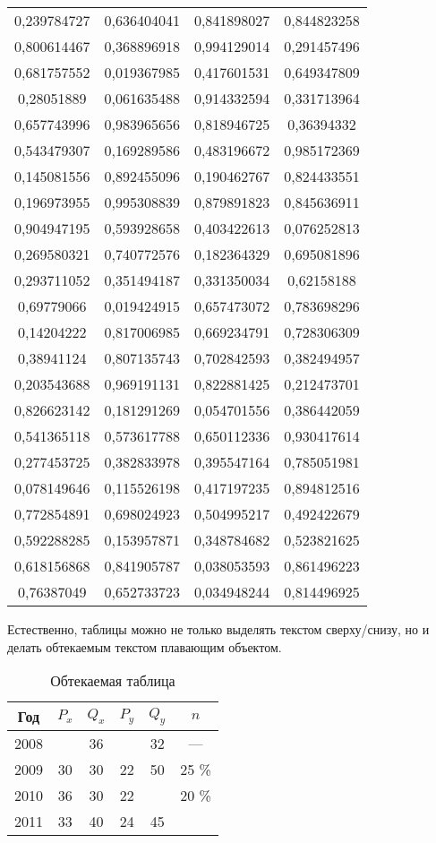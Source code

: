 \documentclass[a4paper,12pt]{article} %
\begin{document}
\begin{longtable}{|c|c|c|c|}
	0,239784727 & 0,636404041 & 0,841898027 & 0,844823258 \\
	0,800614467 & 0,368896918 & 0,994129014 & 0,291457496 \\
	0,681757552 & 0,019367985 & 0,417601531 & 0,649347809 \\
	0,28051889 & 0,061635488 & 0,914332594 & 0,331713964 \\
	0,657743996 & 0,983965656 & 0,818946725 & 0,36394332 \\
	0,543479307 & 0,169289586 & 0,483196672 & 0,985172369 \\
	0,145081556 & 0,892455096 & 0,190462767 & 0,824433551 \\
	0,196973955 & 0,995308839 & 0,879891823 & 0,845636911 \\
	0,904947195 & 0,593928658 & 0,403422613 & 0,076252813 \\
	0,269580321 & 0,740772576 & 0,182364329 & 0,695081896 \\
	0,293711052 & 0,351494187 & 0,331350034 & 0,62158188 \\
	0,69779066 & 0,019424915 & 0,657473072 & 0,783698296 \\
	0,14204222 & 0,817006985 & 0,669234791 & 0,728306309 \\
	0,38941124 & 0,807135743 & 0,702842593 & 0,382494957 \\
	0,203543688 & 0,969191131 & 0,822881425 & 0,212473701 \\
	0,826623142 & 0,181291269 & 0,054701556 & 0,386442059 \\
	0,541365118 & 0,573617788 & 0,650112336 & 0,930417614 \\
	0,277453725 & 0,382833978 & 0,395547164 & 0,785051981 \\
	0,078149646 & 0,115526198 & 0,417197235 & 0,894812516 \\
	0,772854891 & 0,698024923 & 0,504995217 & 0,492422679 \\
	0,592288285 & 0,153957871 & 0,348784682 & 0,523821625 \\
	0,618156868 & 0,841905787 & 0,038053593 & 0,861496223 \\
	0,76387049 & 0,652733723 & 0,034948244 & 0,814496925 \\
\end{longtable}

Естественно, таблицы можно не только выделять текстом сверху/снизу, но и делать обтекаемым текстом плавающим объектом. 

\begin{wraptable}{r}{0.5\linewidth}
	\begin{tabular}{|c|c|c|c|c|c|}
		\hline
		Год & $P_x$ &$Q_x$ & $P_y$ & $Q_y$ & $n$\\ \hline
		2008 &  & 36 &  & 32 & — \\ \hline
		2009 & 30 & 30 & 22 & 50 & 25 \% \\ \hline
		2010 & 36 & 30 & 22 &  & 20 \% \\ \hline
		2011 & 33 & 40 & 24 & 45 & \\ \hline
	\end{tabular}
	\caption{Обтекаемая таблица}
\end{wraptable}
\end{document}
